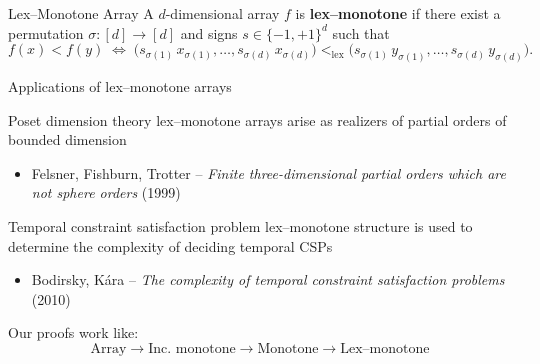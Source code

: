 \begin{frame}{}
  \begin{ffact}{Lex--Monotone Array}
    A \( d \)-dimensional array \( f \) is \textbf{lex--monotone} if there exist
    a permutation \( \sigma : [d] \to [d] \) and signs \( s \in \{-1,+1\}^d \) such that
    \[
      f(x) < f(y) \;\iff\;
      \bigl(s_{\sigma(1)}\,x_{\sigma(1)},\ldots,s_{\sigma(d)}\,x_{\sigma(d)}\bigr)
      <_{\mathrm{lex}}
      \bigl(s_{\sigma(1)}\,y_{\sigma(1)},\ldots,s_{\sigma(d)}\,y_{\sigma(d)}\bigr).
    \]
  \end{ffact}
\end{frame}
\begin{frame}{Applications of lex--monotone arrays}
        \begin{hheading}{Poset dimension theory} lex--monotone arrays arise as realizers 
            of partial orders of bounded dimension
            \begin{itemize}
                \item Felsner, Fishburn, Trotter -- \textit{Finite three-dimensional partial 
                orders which are not sphere orders} (1999)
            \end{itemize}
        \end{hheading}
        \begin{hheading}{Temporal constraint satisfaction problem} lex--monotone structure 
            is used to determine the complexity of deciding temporal CSPs
            \begin{itemize}
                \item Bodirsky, K\'{a}ra -- \textit{The complexity of temporal constraint 
                satisfaction problems} (2010)
            \end{itemize}
        \end{hheading}
\end{frame}
\begin{frame}{}
    Our proofs work like:
    \vspace{-0.5cm}
\[
\text{Array} 
\rightarrow
\text{Inc. monotone}
\rightarrow
\text{Monotone}
\rightarrow
\text{Lex--monotone}
\]
\end{frame}